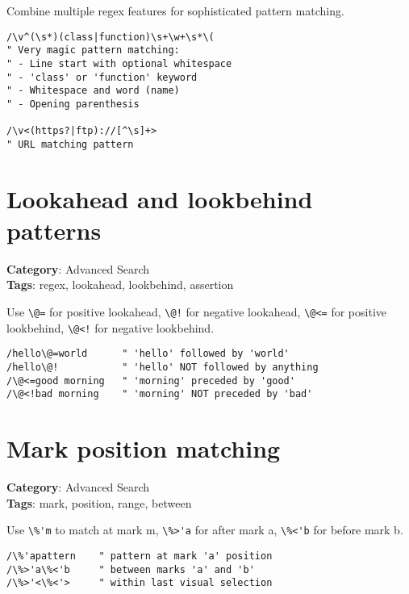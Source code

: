 Combine multiple regex features for sophisticated pattern matching.

\begin{Exa*}{}
\begin{Verbatim}[fontsize=\footnotesize, breaklines, breakanywhere]
/\v^(\s*)(class|function)\s+\w+\s*\(
" Very magic pattern matching:
" - Line start with optional whitespace
" - 'class' or 'function' keyword
" - Whitespace and word (name)
" - Opening parenthesis

/\v<(https?|ftp)://[^\s]+>
" URL matching pattern
\end{Verbatim}
\end{Exa*}

\section{Lookahead and lookbehind patterns}

\textbf{Category}: Advanced Search\\ \textbf{Tags}: regex, lookahead, lookbehind, assertion
\vspace{0.5cm}

Use {\footnotesize \Verb§\@=§} for positive lookahead, {\footnotesize \Verb§\@!§} for negative lookahead, {\footnotesize \Verb§\@<=§} for positive lookbehind, {\footnotesize \Verb§\@<!§} for negative lookbehind.

\begin{Exa*}{}
\begin{Verbatim}[fontsize=\footnotesize, breaklines, breakanywhere]
/hello\@=world      " 'hello' followed by 'world'
/hello\@!           " 'hello' NOT followed by anything
/\@<=good morning   " 'morning' preceded by 'good'
/\@<!bad morning    " 'morning' NOT preceded by 'bad'
\end{Verbatim}
\end{Exa*}

\section{Mark position matching}

\textbf{Category}: Advanced Search\\ \textbf{Tags}: mark, position, range, between
\vspace{0.5cm}

Use {\footnotesize \Verb§\%'m§} to match at mark m, {\footnotesize \Verb§\%>'a§} for after mark a, {\footnotesize \Verb§\%<'b§} for before mark b.

\begin{Exa*}{}
\begin{Verbatim}[fontsize=\footnotesize, breaklines, breakanywhere]
/\%'apattern    " pattern at mark 'a' position
/\%>'a\%<'b     " between marks 'a' and 'b'
/\%>'<\%<'>     " within last visual selection
\end{Verbatim}
\end{Exa*}

